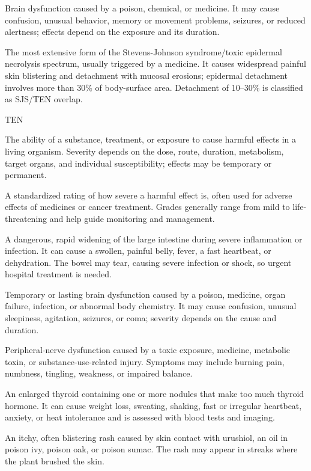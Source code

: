  Brain dysfunction caused by a poison, chemical, or medicine. It may cause confusion, unusual behavior, memory or movement problems, seizures, or reduced alertness; effects depend on the exposure and its duration.

 The most extensive form of the Stevens-Johnson syndrome/toxic epidermal necrolysis spectrum, usually triggered by a medicine. It causes widespread painful skin blistering and detachment with mucosal erosions; epidermal detachment involves more than 30\% of body-surface area. Detachment of 10--30\% is classified as SJS/TEN overlap.

\synonyms
TEN

 The ability of a substance, treatment, or exposure to cause harmful effects in a living organism. Severity depends on the dose, route, duration, metabolism, target organs, and individual susceptibility; effects may be temporary or permanent.

 A standardized rating of how severe a harmful effect is, often used for adverse effects of medicines or cancer treatment. Grades generally range from mild to life-threatening and help guide monitoring and management.

 A dangerous, rapid widening of the large intestine during severe inflammation or infection. It can cause a swollen, painful belly, fever, a fast heartbeat, or dehydration. The bowel may tear, causing severe infection or shock, so urgent hospital treatment is needed.

 Temporary or lasting brain dysfunction caused by a poison, medicine, organ failure, infection, or abnormal body chemistry. It may cause confusion, unusual sleepiness, agitation, seizures, or coma; severity depends on the cause and duration.

 Peripheral-nerve dysfunction caused by a toxic exposure, medicine, metabolic toxin, or substance-use-related injury. Symptoms may include burning pain, numbness, tingling, weakness, or impaired balance.

 An enlarged thyroid containing one or more nodules that make too much thyroid hormone. It can cause weight loss, sweating, shaking, fast or irregular heartbeat, anxiety, or heat intolerance and is assessed with blood tests and imaging.

 An itchy, often blistering rash caused by skin contact with urushiol, an oil in poison ivy, poison oak, or poison sumac. The rash may appear in streaks where the plant brushed the skin.

